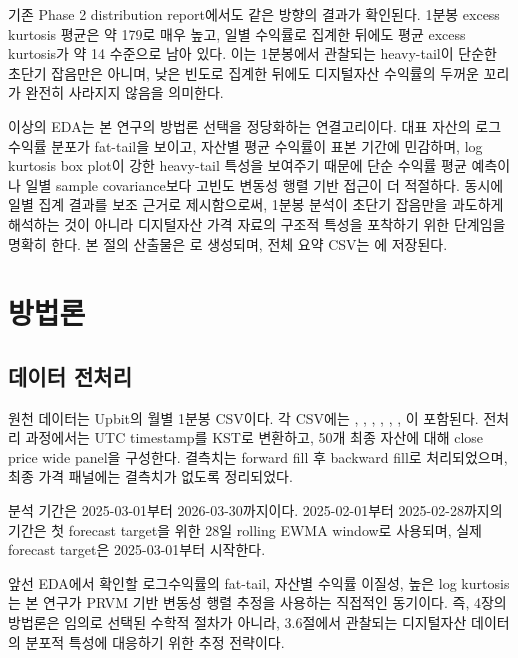 \documentclass[12pt,a4paper]{article}
\begin{document}
기존 Phase 2 distribution report에서도 같은 방향의 결과가 확인된다. 1분봉 excess kurtosis 평균은 약 179로 매우 높고, 일별 수익률로 집계한 뒤에도 평균 excess kurtosis가 약 14 수준으로 남아 있다. 이는 1분봉에서 관찰되는 heavy-tail이 단순한 초단기 잡음만은 아니며, 낮은 빈도로 집계한 뒤에도 디지털자산 수익률의 두꺼운 꼬리가 완전히 사라지지 않음을 의미한다.

이상의 EDA는 본 연구의 방법론 선택을 정당화하는 연결고리이다. 대표 자산의 로그수익률 분포가 fat-tail을 보이고, 자산별 평균 수익률이 표본 기간에 민감하며, log kurtosis box plot이 강한 heavy-tail 특성을 보여주기 때문에 단순 수익률 평균 예측이나 일별 sample covariance보다 고빈도 변동성 행렬 기반 접근이 더 적절하다. 동시에 일별 집계 결과를 보조 근거로 제시함으로써, 1분봉 분석이 초단기 잡음만을 과도하게 해석하는 것이 아니라 디지털자산 가격 자료의 구조적 특성을 포착하기 위한 단계임을 명확히 한다. 본 절의 산출물은 \texttt{}로 생성되며, 전체 요약 CSV는 \texttt{}에 저장된다.


\section{방법론}

\subsection{데이터 전처리}

원천 데이터는 Upbit의 월별 1분봉 CSV이다. 각 CSV에는 \texttt{}, \texttt{}, \texttt{}, \texttt{}, \texttt{}, \texttt{}, \texttt{}이 포함된다. 전처리 과정에서는 UTC timestamp를 KST로 변환하고, 50개 최종 자산에 대해 close price wide panel을 구성한다. 결측치는 forward fill 후 backward fill로 처리되었으며, 최종 가격 패널에는 결측치가 없도록 정리되었다.

분석 기간은 2025-03-01부터 2026-03-30까지이다. 2025-02-01부터 2025-02-28까지의 기간은 첫 forecast target을 위한 28일 rolling EWMA window로 사용되며, 실제 forecast target은 2025-03-01부터 시작한다.

앞선 EDA에서 확인할 로그수익률의 fat-tail, 자산별 수익률 이질성, 높은 log kurtosis는 본 연구가 PRVM 기반 변동성 행렬 추정을 사용하는 직접적인 동기이다. 즉, 4장의 방법론은 임의로 선택된 수학적 절차가 아니라, 3.6절에서 관찰되는 디지털자산 데이터의 분포적 특성에 대응하기 위한 추정 전략이다.
\end{document}
